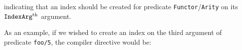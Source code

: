 
\noindent
indicating that an index should be created for predicate 
{\tt Functor}/{\tt Arity} on its ${\tt IndexArg}^{\rm th}$ argument.

%
%


As an example, if we wished to create an index on the third argument 
of predicate {\tt foo/5}, the compiler directive would be:



